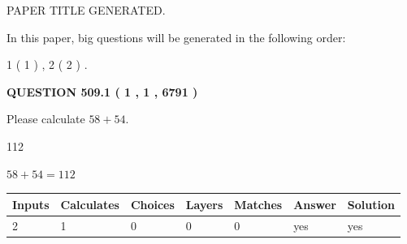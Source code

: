 \documentclass[12pt]{article}
\begin{document}
   
   
   
   
   
 \vspace{0.2in}
 
 
 
 
   
   
 PAPER TITLE GENERATED.
   
   
   
\vspace{0.2in}
   
In this paper, big questions will be generated in the following order: 
   
   
   1 ( 1 )
 ,
   2 ( 2 )
 .
  
\vspace{0.2in}
  
{\textbf{\Large{QUESTION
509.1 
 ( 1 , 1 , 6791 )
}}}
  
  
 
Please calculate $ %
58 +  %
54 $.
 
 
 
\noindent{}
 
 

112
 
 
\noindent{}
 
 

 
 
 
\noindent{}
 
 

$ %
58 +  %
54=   %
112$
 
 
\noindent{}
 
 

 
   
   
   
   
\noindent\begin{tabular}{|l|l|l|l|l|l|l|}
 \hline
Inputs & Calculates & Choices & Layers & Matches & Answer & Solution \\ \hline
 2  & 
 1  & 
 0
  & 
 0  & 
 0  & 
  yes & 
  yes 
  \\ \hline
 \end{tabular}
   
   
   
   
\noindent{}
   
\end{document}
